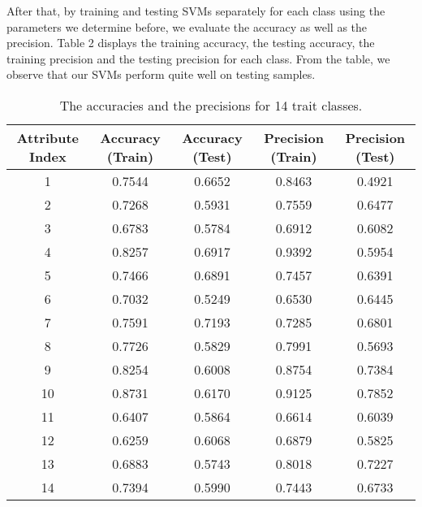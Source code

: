 \documentclass[10pt]{article}
\begin{document}
	After that, by training and testing SVMs separately for each class using the parameters we determine before, we evaluate the accuracy as well as the precision. Table 2 displays the training accuracy, the testing accuracy, the training precision and the testing precision for each class. From the table, we observe that our SVMs perform quite well on testing samples.\\
	\begin{table}[ht]
 		\centering
 		\begin{tabular}{|c|c|c|c|c|}
		\hline
		\textbf{Attribute Index} & \textbf{Accuracy (Train)} & \textbf{Accuracy (Test)} & \textbf{Precision (Train)} & \textbf{Precision (Test)} \\ \hline
		1 & 0.7544 & 0.6652 & 0.8463 & 0.4921\\ \hline
		2 & 0.7268 & 0.5931 & 0.7559 & 0.6477\\ \hline
		3 & 0.6783 & 0.5784 & 0.6912 & 0.6082\\ \hline
		4 & 0.8257 & 0.6917 & 0.9392 & 0.5954\\ \hline
		5 & 0.7466 & 0.6891 & 0.7457 & 0.6391\\ \hline
		6 & 0.7032 & 0.5249 & 0.6530 & 0.6445\\ \hline
		7 & 0.7591 & 0.7193 & 0.7285 & 0.6801\\ \hline
		8 & 0.7726 & 0.5829 & 0.7991 & 0.5693\\ \hline
		9 & 0.8254 & 0.6008 & 0.8754 & 0.7384\\ \hline
		10 & 0.8731 & 0.6170 & 0.9125 & 0.7852\\ \hline
		11 & 0.6407 & 0.5864 & 0.6614 & 0.6039\\ \hline
		12 & 0.6259 & 0.6068 & 0.6879 & 0.5825\\ \hline
		13 & 0.6883 & 0.5743 & 0.8018 & 0.7227\\ \hline
		14 & 0.7394 & 0.5990 & 0.7443 & 0.6733\\ \hline
 		\end{tabular}
		\caption{The accuracies and the precisions for 14 trait classes.}\label{tab2}
	\end{table}\\
\end{document}
